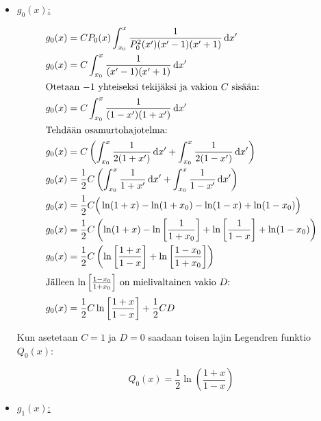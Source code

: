 \documentclass[../johdoksia.tex]{subfiles}
\begin{document}
	\begin{itemize}
		\item \underline{$g_0(x)$:}
			
		\begin{align*}
			g_0(x) &= CP_0(x)\int_{x_0}^{x}\frac{1}{P_0^2(x')(x' - 1)(x' + 1)}\odif{x'} \\
			g_0(x) &= C\int_{x_0}^{x}\frac{1}{(x' - 1)(x' + 1)}\odif{x'} \\
			\intertext{Otetaan $-1$ yhteiseksi tekijäksi ja vakion $C$ sisään:}
			g_0(x) &= C\int_{x_0}^{x}\frac{1}{(1 - x')(1 + x')}\odif{x'} \\
			\intertext{Tehdään osamurtohajotelma:}
			g_0(x) &= C\left(\int_{x_0}^{x}\frac{1}{2(1 + x')}\odif{x'} + \int_{x_0}^{x}\frac{1}{2(1 - x')}\odif{x'}\right) \\
			g_0(x) &= \frac{1}{2}C\left(\int_{x_0}^{x}\frac{1}{1 + x'}\odif{x'} + \int_{x_0}^{x}\frac{1}{1 - x'}\odif{x'}\right) \\
			g_0(x) &= \frac{1}{2}C\Big(\ln(1 + x) - \ln(1 + x_0) - \ln(1 - x) + \ln(1 - x_0)\Big) \\
			g_0(x) &= \frac{1}{2}C\left(\ln(1 + x) - \ln\left[\frac{1}{1 + x_0}\right] + \ln\left[\frac{1}{1 - x}\right] + \ln(1 - x_0)\right) \\
			g_0(x) &= \frac{1}{2}C\left(\ln\left[\frac{1 + x}{1 - x}\right] + \ln\left[\frac{1 - x_0}{1 + x_0}\right]\right) \\
			\intertext{Jälleen $\ln\left[\frac{1 - x_0}{1 + x_0}\right]$ on mielivaltainen vakio $D$:}
			g_0(x) &= \frac{1}{2}C\ln\left[\frac{1 + x}{1 - x}\right] + \frac{1}{2}CD
		\end{align*}
	
		\noindent Kun asetetaan $C = 1$ ja $D = 0$ saadaan toisen lajin Legendren funktio $Q_0(x)$:
		
		\begin{equation*}
			Q_0(x) = \frac{1}{2}\ln\left(\frac{1 + x}{1 - x}\right)	
		\end{equation*}
		
		\item \underline{$g_1(x)$:}
		

\end{itemize}
\end{document}
